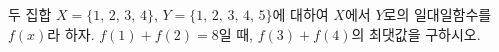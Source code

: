 두 집합 $X=\{1,\,2,\,3,\,4\}$, $Y=\{1,\,2,\,3,\,4,\,5\}$에 대하여 $X$에서 $Y$로의 일대일함수를 $f(x)$라 하자. $f(1)+f(2)=8$일 때, $f(3)+f(4)$의 최댓값을 구하시오.
